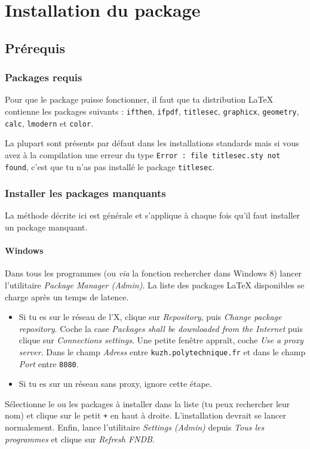 \documentclass[a4paper,12pt,twoside]{article}
\begin{document}
\section{Installation du package}

\subsection{Prérequis}

\subsubsection{Packages requis}

Pour que le package puisse fonctionner, il faut que ta distribution LaTeX contienne les packages suivants : \texttt{ifthen}, \texttt{ifpdf}, \texttt{titlesec}, \texttt{graphicx}, \texttt{geometry}, \texttt{calc}, \texttt{lmodern} et \texttt{color}.

La plupart sont présents par défaut dans les installations standards mais si vous avez à la compilation une erreur du type \verb|Error : file titlesec.sty not found|, c'est que tu n'as pas installé le package \texttt{titlesec}.

\subsubsection{Installer les packages manquants}

La méthode décrite ici est générale et s'applique à chaque fois qu'il faut installer un package manquant.

\paragraph{Windows} Dans tous les programmes (ou \emph{via} la fonction rechercher dans Windows 8) lancer l'utilitaire \emph{Package Manager (Admin)}. La liste des packages LaTeX disponibles se charge après un temps de latence. 
\begin{itemize}
	\item Si tu es sur le réseau de l'X,  clique sur \emph{Repository}, puis \emph{Change package repository}. Coche la case \emph{Packages shall be downloaded from the Internet} puis clique sur \emph{Connections settings}. Une petite fenêtre appraît, coche \emph{Use a proxy server}. Dans le champ \emph{Adress} entre \texttt{kuzh.polytechnique.fr} et dans le champ \emph{Port} entre \texttt{8080}.
	\item Si tu es sur un réseau sans proxy, ignore cette étape.
\end{itemize}
Sélectionne le ou les packages à installer dans la liste (tu peux rechercher leur nom) et clique sur le petit \texttt{+} en haut à droite. L'installation devrait se lancer normalement. Enfin, lance l'utilitaire \emph{Settings (Admin)} depuis \emph{Tous les programmes} et clique sur \emph{Refresh FNDB}.
\end{document}
